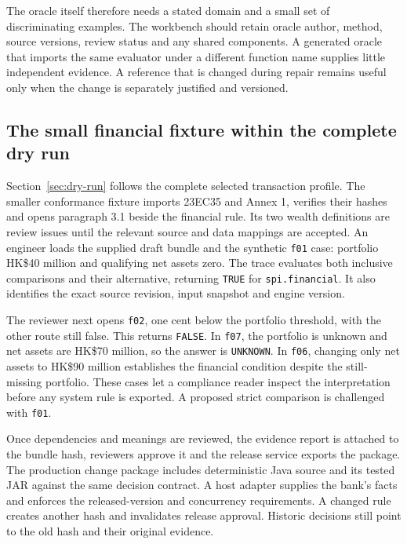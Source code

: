 \documentclass[12pt,a4paper,oneside,openany]{book}
\begin{document}
The oracle itself therefore needs a stated domain and a small set of discriminating
examples. The workbench should retain oracle author, method, source versions,
review status and any shared components. A generated oracle that imports the same
evaluator under a different function name supplies little independent evidence.
A reference that is changed during repair remains useful only when the change is
separately justified and versioned.

\subsection{The small financial fixture within the complete dry run}
\label{merge:P-03c-storage-review:01}


Section~\ref{sec:dry-run} follows the complete selected transaction profile.
The smaller conformance fixture imports 23EC35 and Annex 1, verifies their hashes and
opens paragraph 3.1 beside the financial rule. Its two wealth definitions are
review issues until the relevant source and data mappings are accepted. An
engineer loads the supplied draft bundle and the synthetic \texttt{f01} case:
portfolio HK\$40 million and qualifying net assets zero. The trace evaluates
both inclusive comparisons and their alternative, returning \texttt{TRUE} for
\texttt{spi.financial}. It also identifies the exact source revision, input
snapshot and engine version.

The reviewer next opens \texttt{f02}, one cent below the portfolio threshold,
with the other route still false. This returns \texttt{FALSE}. In \texttt{f07},
the portfolio is unknown and net assets are HK\$70 million, so the answer is
\texttt{UNKNOWN}. In \texttt{f06}, changing only net assets to HK\$90 million
establishes the financial condition despite the still-missing portfolio. These
cases let a compliance reader inspect the interpretation before any system rule
is exported. A proposed strict comparison is challenged with \texttt{f01}.

Once dependencies and meanings are reviewed, the evidence report is attached to
the bundle hash, reviewers approve it and the release service exports the package.
The production change package includes deterministic Java source and its tested
JAR against the same decision contract. A host adapter supplies the bank's
facts and enforces the released-version and concurrency requirements.
A changed rule creates another hash and invalidates release approval. Historic
decisions still point to the old hash and their original evidence.
\end{document}
